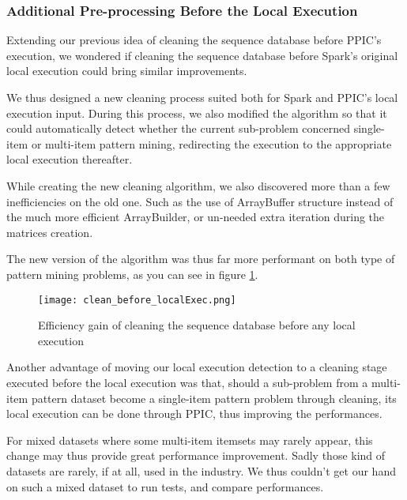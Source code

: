 \documentclass{eplmastersthesis}
\begin{document}
\subsubsection{Additional Pre-processing Before the Local Execution}

Extending our previous idea of cleaning the sequence database before PPIC's execution, we wondered if cleaning the sequence database before Spark's original local execution could bring similar improvements. \newline

We thus designed a new cleaning process suited both for Spark and PPIC's local execution input. During this process, we also modified the algorithm so that it could automatically detect whether the current sub-problem concerned single-item or multi-item pattern mining, redirecting the execution to the appropriate local execution thereafter. \newline

While creating the new cleaning algorithm, we also discovered more than a few inefficiencies on the old one. Such as the use of ArrayBuffer structure instead of the much more efficient ArrayBuilder, or un-needed extra iteration during the matrices creation. \newline

The new version of the algorithm was thus far more performant on both type of pattern mining problems, as you can see in figure \ref{fig:cleaning_before_local_exec}. \newline

\begin{figure}[h]
  \centering
  \texttt{[image: clean\_before\_localExec.png]}
  \caption{Efficiency gain of cleaning the sequence database before any local execution}
  \label{fig:cleaning_before_local_exec}
\end{figure}

Another advantage of moving our local execution detection to a cleaning stage executed before the local execution was that, should a sub-problem from a multi-item pattern dataset become a single-item pattern problem through cleaning, its local execution can be done through PPIC, thus improving the performances. \newline

For mixed datasets where some multi-item itemsets may rarely appear, this change may thus provide great performance improvement. Sadly those kind of datasets are rarely, if at all, used in the industry. We thus couldn't get our hand on such a mixed dataset to run tests, and compare performances.
\end{document}
